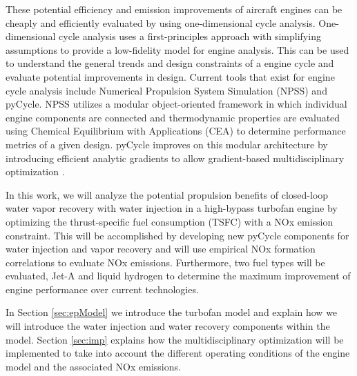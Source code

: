 \documentclass[]{icas2022}
\begin{document}
These potential efficiency and emission improvements of aircraft engines can be cheaply and efficiently evaluated by using one-dimensional cycle analysis. One-dimensional cycle analysis uses a first-principles approach with simplifying assumptions to provide a low-fidelity model for engine analysis. This can be used to understand the general trends and design constraints of a engine cycle and evaluate potential improvements in design. Current tools that exist for engine cycle analysis include Numerical Propulsion System Simulation (NPSS) and pyCycle. NPSS utilizes a modular object-oriented framework in which individual engine components are connected and thermodynamic properties are evaluated using Chemical Equilibrium with Applications (CEA) to determine performance metrics of a given design. pyCycle improves on this modular architecture by introducing efficient analytic gradients to allow gradient-based multidisciplinary optimization \cite{Hendricks2019}. 

In this work, we will analyze the potential propulsion benefits of closed-loop water vapor recovery with water injection in a high-bypass turbofan engine by optimizing the thrust-specific fuel consumption (TSFC) with a NOx emission constraint. This will be accomplished by developing new pyCycle components for water injection and vapor recovery and will use empirical NOx formation correlations to evaluate NOx emissions. Furthermore, two fuel types will be evaluated, Jet-A and liquid hydrogen to determine the maximum improvement of engine performance over current technologies.

In Section \ref{sec:epModel} we introduce the turbofan model and explain how we will introduce the water injection and water recovery components within the model.
Section \ref{sec:imp} explains how the multidisciplinary optimization will be implemented to take into account the different operating conditions of the engine model and the associated NOx emissions.
\end{document}
